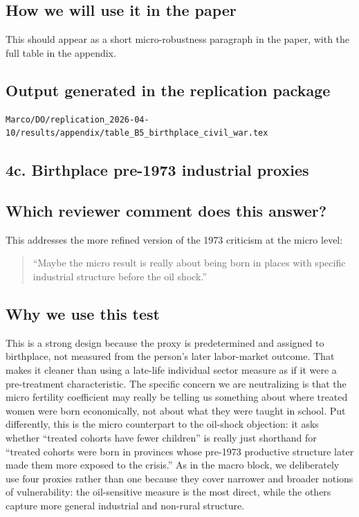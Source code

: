 \documentclass[11pt]{article}
\begin{document}
\subsection*{How we will use it in the paper}

This should appear as a short micro-robustness paragraph in the paper, with the full table in the appendix.

\subsection*{Output generated in the replication package}

\begin{verbatim}
Marco/DO/replication_2026-04-10/results/appendix/table_B5_birthplace_civil_war.tex
\end{verbatim}

\subsection*{4c. Birthplace pre-1973 industrial proxies}\label{sec:oilshock-4c}

\subsection*{Which reviewer comment does this answer?}

This addresses the more refined version of the 1973 criticism at the micro level:

\begin{quote}
``Maybe the micro result is really about being born in places with specific industrial structure before the oil shock.''
\end{quote}

\subsection*{Why we use this test}

This is a strong design because the proxy is predetermined and assigned to birthplace, not measured from the person's later labor-market outcome. That makes it cleaner than using a late-life individual sector measure as if it were a pre-treatment characteristic. The specific concern we are neutralizing is that the micro fertility coefficient may really be telling us something about where treated women were born economically, not about what they were taught in school. Put differently, this is the micro counterpart to the oil-shock objection: it asks whether ``treated cohorts have fewer children'' is really just shorthand for ``treated cohorts were born in provinces whose pre-1973 productive structure later made them more exposed to the crisis.'' As in the macro block, we deliberately use four proxies rather than one because they cover narrower and broader notions of vulnerability: the oil-sensitive measure is the most direct, while the others capture more general industrial and non-rural structure.
\end{document}
